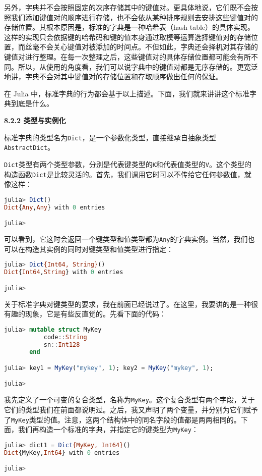 另外，字典并不会按照固定的次序存储其中的键值对。更具体地说，它们既不会按照我们添加键值对的顺序进行存储，也不会依从某种排序规则去安排这些键值对的存储位置。其根本原因是，标准的字典是一种哈希表（hash table）的具体实现。这样的实现只会依据键的哈希码和键的值本身通过取模等运算选择键值对的存储位置，而丝毫不会关心键值对被添加的时间点。不但如此，字典还会择机对其存储的键值对进行整理。在每一次整理之后，这些键值对的具体存储位置都可能会有所不同。所以，从使用的角度看，我们可以说字典中的键值对都是无序存储的。更宽泛地讲，字典不会对其中键值对的存储位置和存取顺序做出任何的保证。

在 Julia 中，标准字典的行为都会基于以上描述。下面，我们就来讲讲这个标准字典到底是什么。

\textbf{8.2.2 类型与实例化}

标准字典的类型名为\verb|Dict|，是一个参数化类型，直接继承自抽象类型\verb|AbstractDict|。

\verb|Dict|类型有两个类型参数，分别是代表键类型的\verb|K|和代表值类型的\verb|V|。这个类型的构造函数\verb|Dict|是比较灵活的。首先，我们调用它时可以不传给它任何参数值，就像这样：
\begin{lstlisting}[language=julia]
julia> Dict()
Dict{Any,Any} with 0 entries

julia> 
\end{lstlisting}

可以看到，它这时会返回一个键类型和值类型都为\verb|Any|的字典实例。当然，我们也可以在构造其实例的同时对键类型和值类型进行指定：
\begin{lstlisting}[language=julia]
julia> Dict{Int64, String}()
Dict{Int64,String} with 0 entries

julia> 
\end{lstlisting}

关于标准字典对键类型的要求，我在前面已经说过了。在这里，我要讲的是一种很有趣的现象，它是有些反直觉的。先看下面的代码：
\begin{lstlisting}[language=julia]
julia> mutable struct MyKey
           code::String
           sn::Int128
       end

julia> key1 = MyKey("mykey", 1); key2 = MyKey("mykey", 1);

julia> 
\end{lstlisting}

我先定义了一个可变的复合类型，名称为\verb|MyKey|。这个复合类型有两个字段，关于它们的类型我们在前面都说明过。之后，我又声明了两个变量，并分别为它们赋予了\verb|MyKey|类型的值。注意，这两个结构体中的同名字段的值都是两两相同的。下面，我们再构造一个标准的字典，并指定它的键类型为\verb|MyKey|：
\begin{lstlisting}[language=julia]
julia> dict1 = Dict{MyKey, Int64}()
Dict{MyKey,Int64} with 0 entries

julia> 
\end{lstlisting}

